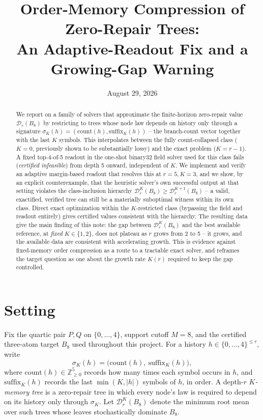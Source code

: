 \documentclass[11pt,a4paper]{article}
\title{\textbf{Order-Memory Compression of Zero-Repair Trees:\\
An Adaptive-Readout Fix and a Growing-Gap Warning}}
\author{}
\date{August 29, 2026}
\newcommand{\D}{\mathscr D}
\begin{document}
\maketitle

\begin{abstract}
We report on a family of solvers that approximate the finite-horizon zero-repair
value $\D_r(B_8)$ by restricting to trees whose node law depends on history only
through a signature $\sigma_K(h) = (\mathrm{count}(h), \mathrm{suffix}_K(h))$ --
the branch-count vector together with the last $K$ symbols. This interpolates
between the fully count-collapsed class ($K=0$, previously shown to be
substantially lossy) and the exact problem ($K=r-1$). A fixed top-4-of-5 readout
in the one-shot binary32 field solver used for this class fails
(\emph{certified infeasible}) from depth 5 onward, independent of $K$. We
implement and verify an adaptive margin-based readout that resolves this at
$r=5,K=3$, and we show, by an explicit counterexample, that the heuristic
solver's own successful output at that setting violates the class-inclusion
hierarchy $\D_r^{K}(B_8) \ge \D_r^{K+1}(B_8)$ -- a valid, exactified, verified
tree can still be a materially suboptimal witness within its own class. Direct
exact optimization within the $K$-restricted class (bypassing the field and
readout entirely) gives certified values consistent with the hierarchy. The
resulting data give the main finding of this note: the gap between
$\D_r^{K}(B_8)$ and the best available reference, at \emph{fixed} $K\in\{1,2\}$,
does not plateau as $r$ grows from 2 to 5 -- it grows, and the available data are
consistent with accelerating growth. This is evidence against fixed-memory
order compression as a route to a tractable exact solver, and reframes the
target question as one about the growth rate $K(r)$ required to keep the gap
controlled.
\end{abstract}

\section{Setting}

Fix the quartic pair $P,Q$ on $\{0,\dots,4\}$, support cutoff $M=8$, and the
certified three-atom target $B_8$ used throughout this project. For a history
$h\in\{0,\dots,4\}^{\le r}$, write
\[
\sigma_K(h) = \bigl(\mathrm{count}(h),\ \mathrm{suffix}_K(h)\bigr),
\]
where $\mathrm{count}(h)\in\mathbb Z_{\ge0}^5$ records how many times each
symbol occurs in $h$, and $\mathrm{suffix}_K(h)$ records the last $\min(K,|h|)$
symbols of $h$, in order. A depth-$r$ \emph{$K$-memory tree} is a zero-repair
tree in which every node's law is required to depend on its history only
through $\sigma_K$. Let $\D_r^{K}(B_8)$ denote the minimum root mean over such
trees whose leaves stochastically dominate $B_8$.
\end{document}
